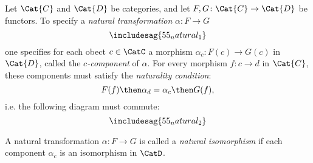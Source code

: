 \begin{ctdefinition}
Let $\Cat{C}$ and $\Cat{D}$ be categories, and let $F,G\colon \Cat{C}\to \Cat{D}$ be functors. To specify a \emph{natural transformation} $\alpha\colon F\to G$
\begin{equation}
\includesag{55_natural_1}
\end{equation}
one specifies for each obect $c\in \CatC$ a morphism $\alpha_c\colon F(c)\to G(c)$ in $\Cat{D}$, called the $c$\emph{-component} of $\alpha$. For every morphism $f\colon c\to d$ in $\Cat{C}$, these components must satisfy the \emph{naturality condition}:
\begin{equation}
    F(f)\then \alpha_d = \alpha_c\then G(f),
\end{equation}
i.e. the following diagram must commute:
\begin{equation}
\includesag{55_natural_2}
\end{equation}
\end{ctdefinition}

\begin{ctdefinition}
\label{def:nat_iso}
A natural transformation $\alpha\colon F\to G$ is called a \emph{natural isomorphism} if each component $\alpha_c$ is an isomorphism in $\CatD$.
\end{ctdefinition}